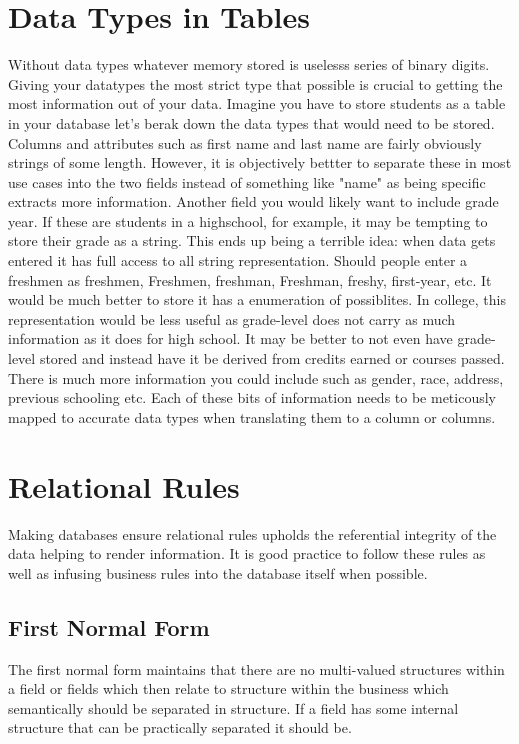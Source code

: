 \documentclass[letterpaper, 10pt]{article}
\begin{document}
\section{Data Types in Tables}
Without data types whatever memory stored is uselesss series of 
   binary digits. 
Giving your datatypes the most strict type that possible
   is crucial to getting the most information out of your data.
Imagine you have to store students as a table in your database
   let's berak down the data types that would need to be stored.
Columns and attributes such as first name and last name are fairly
   obviously strings of some length.
However, it is objectively bettter to separate these in most use cases
   into the two fields instead of something like "name" as being
   specific extracts more information.
Another field you would likely want to include grade year.
If these are students in a highschool, for example, it
   may be tempting to store their grade as a string.
This ends up being a terrible idea: when data gets entered
   it has full access to all string representation.
Should people enter a freshmen as freshmen, Freshmen, freshman,
   Freshman, freshy, first-year, etc.
It would be much better to store it has a enumeration of 
   possiblites.
In college, this representation would be less useful as 
   grade-level does not carry as much information as it does
   for high school.
It may be better to not even have grade-level stored and instead
   have it be derived from credits earned or courses passed.
There is much more information you could include such as
   gender, race, address, previous schooling etc.
Each of these bits of information needs to be meticously mapped
   to accurate data types when translating them to a column or columns.
\section{Relational Rules}
Making databases ensure relational rules upholds the referential integrity of the data helping to render 
   information.
It is good practice to follow these rules as well as infusing business rules into the database
   itself when possible.
\subsection{First Normal Form}
The first normal form maintains that there are no multi-valued structures within a 
    field or fields which then relate to structure within the business which
    semantically should be separated in structure.
If a field has some internal structure that can be practically separated it should be. 
\end{document}
